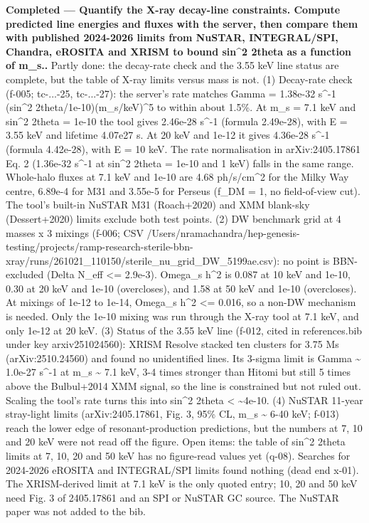 \documentclass[11pt,a4paper]{article}
\begin{document}
\textbf{Completed --- Quantify the X-ray decay-line constraints. Compute predicted line energies and fluxes with the server, then compare them with published 2024-2026 limits from NuSTAR, INTEGRAL/SPI, Chandra, eROSITA and XRISM to bound sin\textasciicircum{}2 2theta as a function of m\_s..} Partly done: the decay-rate check and the 3.55 keV line status are complete, but the table of X-ray limits versus mass is not. (1) Decay-rate check (f-005; tc-...-25, tc-...-27): the server's rate matches Gamma = 1.38e-32 s\textasciicircum{}-1 (sin\textasciicircum{}2 2theta/1e-10)(m\_s/keV)\textasciicircum{}5 to within about 1.5\%. At m\_s = 7.1 keV and sin\textasciicircum{}2 2theta = 1e-10 the tool gives 2.46e-28 s\textasciicircum{}-1 (formula 2.49e-28), with E = 3.55 keV and lifetime 4.07e27 s. At 20 keV and 1e-12 it gives 4.36e-28 s\textasciicircum{}-1 (formula 4.42e-28), with E = 10 keV. The rate normalisation in arXiv:2405.17861 Eq. 2 (1.36e-32 s\textasciicircum{}-1 at sin\textasciicircum{}2 2theta = 1e-10 and 1 keV) falls in the same range. Whole-halo fluxes at 7.1 keV and 1e-10 are 4.68 ph/s/cm\textasciicircum{}2 for the Milky Way centre, 6.89e-4 for M31 and 3.55e-5 for Perseus (f\_DM = 1, no field-of-view cut). The tool's built-in NuSTAR M31 (Roach+2020) and XMM blank-sky (Dessert+2020) limits exclude both test points. (2) DW benchmark grid at 4 masses x 3 mixings (f-006; CSV /Users/nramachandra/hep-genesis-testing/projects/ramp-research-sterile-bbn-xray/runs/261021\_110150/sterile\_nu\_grid\_DW\_5199ae.csv): no point is BBN-excluded (Delta N\_eff \textless{}= 2.9e-3). Omega\_s h\textasciicircum{}2 is 0.087 at 10 keV and 1e-10, 0.30 at 20 keV and 1e-10 (overcloses), and 1.58 at 50 keV and 1e-10 (overcloses). At mixings of 1e-12 to 1e-14, Omega\_s h\textasciicircum{}2 \textless{}= 0.016, so a non-DW mechanism is needed. Only the 1e-10 mixing was run through the X-ray tool at 7.1 keV, and only 1e-12 at 20 keV. (3) Status of the 3.55 keV line (f-012, cited in references.bib under key arxiv251024560): XRISM Resolve stacked ten clusters for 3.75 Ms (arXiv:2510.24560) and found no unidentified lines. Its 3-sigma limit is Gamma \textasciitilde{} 1.0e-27 s\textasciicircum{}-1 at m\_s \textasciitilde{} 7.1 keV, 3-4 times stronger than Hitomi but still 5 times above the Bulbul+2014 XMM signal, so the line is constrained but not ruled out. Scaling the tool's rate turns this into sin\textasciicircum{}2 2theta \textless{} \textasciitilde{}4e-10. (4) NuSTAR 11-year stray-light limits (arXiv:2405.17861, Fig. 3, 95\% CL, m\_s \textasciitilde{} 6-40 keV; f-013) reach the lower edge of resonant-production predictions, but the numbers at 7, 10 and 20 keV were not read off the figure. Open items: the table of sin\textasciicircum{}2 2theta limits at 7, 10, 20 and 50 keV has no figure-read values yet (q-08). Searches for 2024-2026 eROSITA and INTEGRAL/SPI limits found nothing (dead end x-01). The XRISM-derived limit at 7.1 keV is the only quoted entry; 10, 20 and 50 keV need Fig. 3 of 2405.17861 and an SPI or NuSTAR GC source. The NuSTAR paper was not added to the bib.
\end{document}

